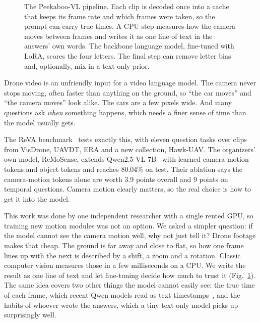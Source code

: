 \begin{figure}[t]
{}
\caption{The Peekaboo-VL pipeline. Each clip is decoded once into a cache
that keeps its frame rate and which frames were taken, so the prompt can
carry true times. A CPU step measures how the camera moves between frames
and writes it as one line of text in the answers' own words. The backbone
language model, fine-tuned with LoRA, scores the four letters. The final step can remove letter bias
and, optionally, mix in a text-only prior.}
\label{fig:system}
\end{figure}


Drone video is an unfriendly input for a video language model. The camera
never stops moving, often faster than anything on the ground, so ``the car
moves'' and ``the camera moves'' look alike. The cars are a few pixels
wide. And many questions ask \emph{when} something happens, which needs a
finer sense of time than the model usually gets.

The ReVA benchmark~\cite{yao2026reva} tests exactly this, with eleven
question tasks over clips from VisDrone, UAVDT, ERA and a new collection,
Hawk-UAV. The organizers' own model, ReMoSense, extends
Qwen2.5-VL-7B~\cite{qwen25vl2025} with learned camera-motion tokens and
object tokens and reaches 80.04\% on test. Their ablation says the
camera-motion tokens alone are worth 3.9 points overall and 9 points on
temporal questions. Camera motion clearly matters, so the real choice is
how to get it into the model.

This work was done by one independent researcher with a single rented GPU,
so training new motion modules was not an option. We asked a
simpler question: if the model cannot see the camera motion well, why not
just tell it? Drone footage makes that cheap. The ground is far away and
close to flat, so how one frame lines up with the next is described by a
shift, a zoom and a rotation. Classic computer vision measures those in a
few milliseconds on a CPU. We write the result as one line of text and let
fine-tuning decide how much to trust it (Fig.~\ref{fig:system}). The same
idea covers two other things the model cannot easily see: the true time of
each frame, which recent Qwen models read as text
timestamps~\cite{qwen3vl2025}, and the habits of whoever wrote the
answers, which a tiny text-only model picks up surprisingly well.

